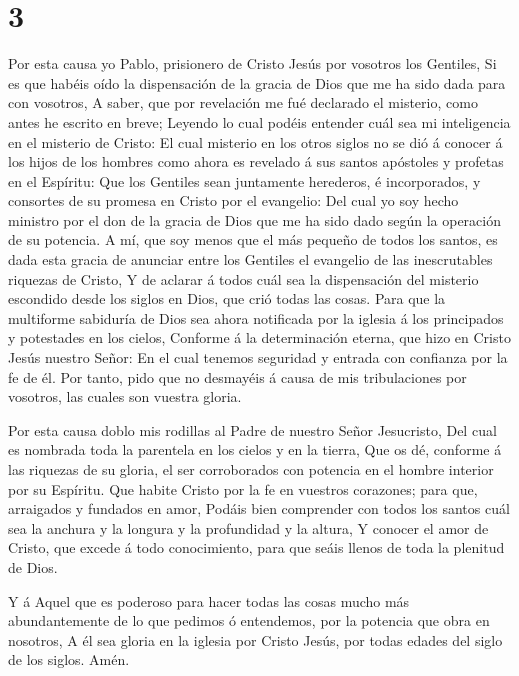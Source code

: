 \hypertarget{section-2}{%
\section{3}\label{section-2}}

 Por esta causa yo Pablo, prisionero de Cristo Jesús por
vosotros los Gentiles,  Si es que habéis oído la
dispensación de la gracia de Dios que me ha sido dada para con vosotros,
 A saber, que por revelación me fué declarado el misterio,
como antes he escrito en breve;  Leyendo lo cual podéis
entender cuál sea mi inteligencia en el misterio de Cristo: 
El cual misterio en los otros siglos no se dió á conocer á los hijos de
los hombres como ahora es revelado á sus santos apóstoles y profetas en
el Espíritu:  Que los Gentiles sean juntamente herederos, é
incorporados, y consortes de su promesa en Cristo por el evangelio:
 Del cual yo soy hecho ministro por el don de la gracia de
Dios que me ha sido dado según la operación de su potencia. 
A mí, que soy menos que el más pequeño de todos los santos, es dada esta
gracia de anunciar entre los Gentiles el evangelio de las inescrutables
riquezas de Cristo,  Y de aclarar á todos cuál sea la
dispensación del misterio escondido desde los siglos en Dios, que crió
todas las cosas.  Para que la multiforme sabiduría de Dios
sea ahora notificada por la iglesia á los principados y potestades en
los cielos,  Conforme á la determinación eterna, que hizo
en Cristo Jesús nuestro Señor:  En el cual tenemos
seguridad y entrada con confianza por la fe de él.  Por
tanto, pido que no desmayéis á causa de mis tribulaciones por vosotros,
las cuales son vuestra gloria.

 Por esta causa doblo mis rodillas al Padre de nuestro
Señor Jesucristo,  Del cual es nombrada toda la parentela
en los cielos y en la tierra,  Que os dé, conforme á las
riquezas de su gloria, el ser corroborados con potencia en el hombre
interior por su Espíritu.  Que habite Cristo por la fe en
vuestros corazones; para que, arraigados y fundados en amor,
 Podáis bien comprender con todos los santos cuál sea la
anchura y la longura y la profundidad y la altura,  Y
conocer el amor de Cristo, que excede á todo conocimiento, para que
seáis llenos de toda la plenitud de Dios.

 Y á Aquel que es poderoso para hacer todas las cosas mucho
más abundantemente de lo que pedimos ó entendemos, por la potencia que
obra en nosotros,  A él sea gloria en la iglesia por Cristo
Jesús, por todas edades del siglo de los siglos. Amén.

